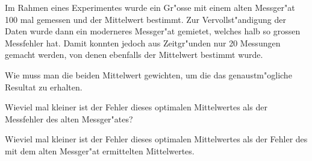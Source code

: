 Im Rahmen eines Experimentes wurde ein Gr"osse mit einem alten Messger"at
100 mal gemessen und der Mittelwert bestimmt.
Zur Vervollst"andigung der Daten wurde dann ein moderneres Messger"at
gemietet, welches halb so grossen Messfehler hat.
Damit konnten jedoch aus Zeitgr"unden nur 20 Messungen gemacht werden,
von denen ebenfalls der Mittelwert bestimmt wurde.
\begin{teilaufgaben}
\item
Wie muss man die beiden Mittelwert gewichten, um die das genaustm"ogliche
Resultat zu erhalten.
\item
Wieviel mal kleiner ist der Fehler dieses optimalen Mittelwertes als 
der Messfehler des alten Messger"ates?
\item
Wieviel mal kleiner ist der Fehler dieses optimalen Mittelwertes als
der Fehler des mit dem alten Messger"at ermittelten Mittelwertes.
\end{teilaufgaben}


